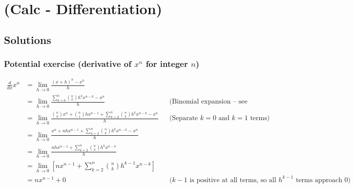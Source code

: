 \documentclass{book}
\begin{document}
\chapter{(Calc - Differentiation)}





\section{Solutions}

\subsection{Potential exercise (derivative of $x^n$ for integer $n$)}

\begin{align*}
\frac{d}{dx}x^n &= \lim_{h \rightarrow 0} \frac{(x+h)^n - x^n}{h} \\
&= \lim_{h \rightarrow 0} \frac{\sum_{k=0}^n \binom{n}{k}h^k x^{n-k} - x^n}{h} && \text{(Binomial expansion -- see chapter)} \\
&= \lim_{h \rightarrow 0} \frac{\binom{n}{0}x^n + \binom{n}{1}hx^{n-1} + \sum_{k=2}^n \binom{n}{k}h^k x^{n-k} - x^n}{h} && \text{(Separate $k=0$ and $k=1$ terms)} \\
&= \lim_{h \rightarrow 0} \frac{x^n + nhx^{n-1} + \sum_{k=2}^n \binom{n}{k}h^k x^{n-k} - x^n}{h} \\
&= \lim_{h \rightarrow 0} \frac{nhx^{n-1} + \sum_{k=2}^n \binom{n}{k}h^k x^{n-k}}{h} \\
&= \lim_{h \rightarrow 0} \left[nx^{n-1} + \sum_{k=2}^n \binom{n}{k}h^{k-1} x^{n-k}\right] \\
&= nx^{n-1} + 0 && \text{($k-1$ is positive at all terms, so all $h^{k-1}$ terms approach 0)}\\
\end{align*}
\end{document}
